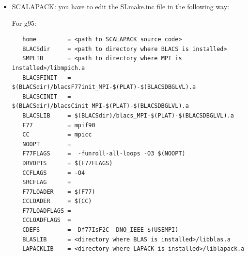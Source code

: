 \documentclass[12pt]{article}
\begin{document}
\begin{itemize}
For gfortran:
\begin{verbatim}
   BTOPdir        = <path to BLACS source code>
   COMMLIB        = MPI
   PLAT           = LINUX
   MPIdir         = <path to directory where MPI is installed>
   INTFACE        = -DAdd_
   SENDIS         =
   BUFF           =  
   TRANSCOMM      = -DCSameF77
   WHATMPI        =
   SYSERRORS      =
   F77            = mpif90
   F77NO_OPTFLAGS = 
   F77FLAGS       = $(F77NO_OPTFLAGS) -O
   F77LOADER      = $(F77)
   F77LOADFLAGS   = 
   CC             = mpicc
   CCFLAGS        = -O
   CCLOADER       = $(CC)
   CCLOADFLAGS    = 
\end{verbatim}

For ifort:
\begin{verbatim}
   BTOPdir        = <path to BLACS source code>
   COMMLIB        = MPI
   MPIdir         = <path to directory where MPI is installed>
   INTFACE        = -DAdd_
   SENDIS         =
   BUFF           = 
   TRANSCOMM      = -DCSameF77
   WHATMPI        =
   SYSERRORS      =
   F77            = mpif90
   F77NO_OPTFLAGS = -O0
   F77FLAGS       = $(F77NO_OPTFLAGS) -O
   F77LOADER      = $(F77)
   F77LOADFLAGS   = 
   CC             = mpicc
   CCFLAGS        = -O
   CCLOADER       = $(CC)
   CCLOADFLAGS    = 
\end{verbatim}

For pgf90:
\begin{verbatim}
   BTOPdir        = <path to BLACS source code>
   COMMLIB        = MPI
   MPIdir         = <path to directory where MPI is installed>
   INTFACE        = -DAdd_
   SENDIS         =
   BUFF           = 
   TRANSCOMM      = -DCSameF77
   WHATMPI        =
   SYSERRORS      =
   F77            = mpif90
   F77NO_OPTFLAGS = 
   F77FLAGS       = $(F77NO_OPTFLAGS) -O
   F77LOADER      = $(F77)
   F77LOADFLAGS   = 
   CC             = mpicc
   CCFLAGS        = -O
   CCLOADER       = $(CC)
   CCLOADFLAGS    = 
\end{verbatim}

\item SCALAPACK: you have to edit the SLmake.inc file in the following way:

For g95:
\begin{verbatim}
   home         = <path to SCALAPACK source code>
   BLACSdir     = <path to directory where BLACS is installed>
   SMPLIB       = <path to directory where MPI is installed>/libmpich.a
   BLACSFINIT   = $(BLACSdir)/blacsF77init_MPI-$(PLAT)-$(BLACSDBGLVL).a
   BLACSCINIT   = $(BLACSdir)/blacsCinit_MPI-$(PLAT)-$(BLACSDBGLVL).a
   BLACSLIB     = $(BLACSdir)/blacs_MPI-$(PLAT)-$(BLACSDBGLVL).a
   F77          = mpif90
   CC           = mpicc
   NOOPT        = 
   F77FLAGS     =  -funroll-all-loops -O3 $(NOOPT)
   DRVOPTS      = $(F77FLAGS)
   CCFLAGS      = -O4
   SRCFLAG      =
   F77LOADER    = $(F77)
   CCLOADER     = $(CC)
   F77LOADFLAGS =
   CCLOADFLAGS  =
   CDEFS        = -Df77IsF2C -DNO_IEEE $(USEMPI)
   BLASLIB      = <directory where BLAS is installed>/libblas.a
   LAPACKLIB    = <directory where LAPACK is installed>/liblapack.a
\end{verbatim}


\end{itemize}
\end{document}
